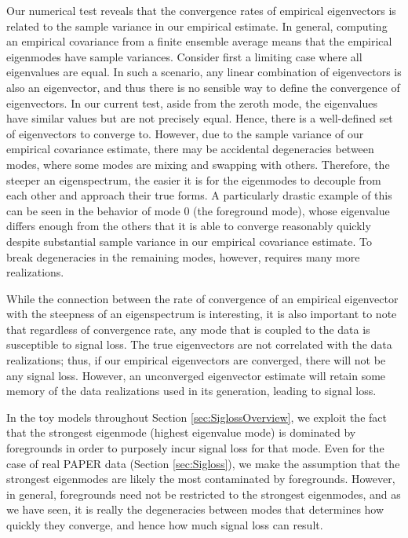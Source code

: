 \documentclass[preprint2,numberedappendix,tighten]{aastex6}  %
\begin{document}
Our numerical test reveals that the convergence rates of empirical eigenvectors is related to the sample variance in our empirical estimate. In general, computing an empirical covariance from a finite ensemble average means that the empirical eigenmodes have sample variances. Consider first a limiting case where all eigenvalues are equal. In such a scenario, any linear combination of eigenvectors is also an eigenvector, and thus there is no sensible way to define the convergence of eigenvectors. In our current test, aside from the zeroth mode, the eigenvalues have similar values but are not precisely equal. Hence, there is a well-defined set of eigenvectors to converge to. However, due to the sample variance of our empirical covariance estimate, there may be accidental degeneracies between modes, where some modes are mixing and swapping with others. Therefore, the steeper an eigenspectrum, the easier it is for the eigenmodes to decouple from each other and approach their true forms. A particularly drastic example of this can be seen in the behavior of mode $0$ (the foreground mode), whose eigenvalue differs enough from the others that it is able to converge reasonably quickly despite substantial sample variance in our empirical covariance estimate. To break degeneracies in the remaining modes, however, requires many more realizations.

While the connection between the rate of convergence of an empirical eigenvector with the steepness of an eigenspectrum is interesting, it is also important to note that regardless of convergence rate, any mode that is coupled to the data is susceptible to signal loss. The true eigenvectors are not correlated with the data realizations; thus, if our empirical eigenvectors are converged, there will not be any signal loss. However, an unconverged eigenvector estimate will retain some memory of the data realizations used in its generation, leading to signal loss.

In the toy models throughout Section \ref{sec:SiglossOverview}, we exploit the fact that the strongest eigenmode (highest eigenvalue mode) is dominated by foregrounds in order to purposely incur signal loss for that mode. Even for the case of real PAPER data (Section \ref{sec:Sigloss}), we make the assumption that the strongest eigenmodes are likely the most contaminated by foregrounds. However, in general, foregrounds need not be restricted to the strongest eigenmodes, and as we have seen, it is really the degeneracies between modes that determines how quickly they converge, and hence how much signal loss can result.
\end{document}
